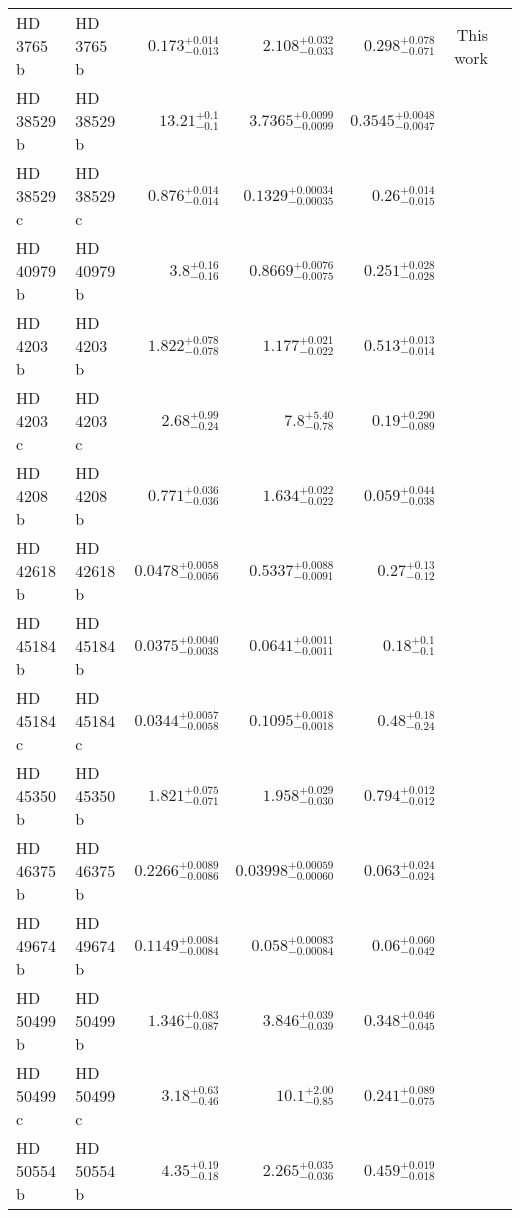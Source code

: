 \begin{longtable*}{llrrrrr}
HD 3765 b & HD 3765 b & $0.173^{+0.014}_{-0.013}$ & $2.108^{+0.032}_{-0.033}$ & $0.298^{+0.078}_{-0.071}$ & This work & \\ 
HD 38529 b & HD 38529 b & $13.21^{+0.1}_{-0.1}$ & $3.7365^{+0.0099}_{-0.0099}$ & $0.3545^{+0.0048}_{-0.0047}$ & \cite{Fischer01} & \\ 
HD 38529 c & HD 38529 c & $0.876^{+0.014}_{-0.014}$ & $0.1329^{+0.00034}_{-0.00035}$ & $0.26^{+0.014}_{-0.015}$ & \cite{Butler06} & \\ 
HD 40979 b & HD 40979 b & $3.8^{+0.16}_{-0.16}$ & $0.8669^{+0.0076}_{-0.0075}$ & $0.251^{+0.028}_{-0.028}$ & \cite{Butler06} & \\ 
HD 4203 b & HD 4203 b & $1.822^{+0.078}_{-0.078}$ & $1.177^{+0.021}_{-0.022}$ & $0.513^{+0.013}_{-0.014}$ & \cite{Vogt02} & \\ 
HD 4203 c & HD 4203 c & $2.68^{+0.99}_{-0.24}$ & $7.8^{+5.40}_{-0.78}$ & $0.19^{+0.290}_{-0.089}$ & \cite{Kane14} & \\ 
HD 4208 b & HD 4208 b & $0.771^{+0.036}_{-0.036}$ & $1.634^{+0.022}_{-0.022}$ & $0.059^{+0.044}_{-0.038}$ & \cite{Vogt02} & \\ 
HD 42618 b & HD 42618 b & $0.0478^{+0.0058}_{-0.0056}$ & $0.5337^{+0.0088}_{-0.0091}$ & $0.27^{+0.13}_{-0.12}$ & \cite{Fulton16} & \\ 
HD 45184 b & HD 45184 b & $0.0375^{+0.0040}_{-0.0038}$ & $0.0641^{+0.0011}_{-0.0011}$ & $0.18^{+0.1}_{-0.1}$ & \cite{Udry19} & \\ 
HD 45184 c & HD 45184 c & $0.0344^{+0.0057}_{-0.0058}$ & $0.1095^{+0.0018}_{-0.0018}$ & $0.48^{+0.18}_{-0.24}$ & \cite{Udry19} & \\ 
HD 45350 b & HD 45350 b & $1.821^{+0.075}_{-0.071}$ & $1.958^{+0.029}_{-0.030}$ & $0.794^{+0.012}_{-0.012}$ & \cite{Marcy05} & \\ 
HD 46375 b & HD 46375 b & $0.2266^{+0.0089}_{-0.0086}$ & $0.03998^{+0.00059}_{-0.00060}$ & $0.063^{+0.024}_{-0.024}$ & \cite{Marcy00} & \\ 
HD 49674 b & HD 49674 b & $0.1149^{+0.0084}_{-0.0084}$ & $0.058^{+0.00083}_{-0.00084}$ & $0.06^{+0.060}_{-0.042}$ & \cite{Butler03} & \\ 
HD 50499 b & HD 50499 b & $1.346^{+0.083}_{-0.087}$ & $3.846^{+0.039}_{-0.039}$ & $0.348^{+0.046}_{-0.045}$ & \cite{Vogt05} & \\ 
HD 50499 c & HD 50499 c & $3.18^{+0.63}_{-0.46}$ & $10.1^{+2.00}_{-0.85}$ & $0.241^{+0.089}_{-0.075}$ & \cite{Rickman19} & \\ 
HD 50554 b & HD 50554 b & $4.35^{+0.19}_{-0.18}$ & $2.265^{+0.035}_{-0.036}$ & $0.459^{+0.019}_{-0.018}$ & \cite{Fischer02} & \\ 

\end{longtable*}
